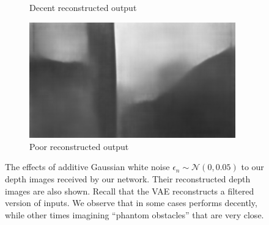 \begin{figure}[H]
\begin{subfigure}[b]{0.49\textwidth}
        \caption{Decent reconstructed output}
        \label{fig:11_0_c_vae_image}
    \end{subfigure} 
    \hfill
    \begin{subfigure}[b]{0.49\textwidth}
        \centering
        \captionsetup{justification=centering}
        \includegraphics[width=0.98\textwidth]{figures/7_2/60_0_c_vae_image.png}
        \caption{Poor reconstructed output}
        \label{fig:60_0_c_vae_image}
    \end{subfigure}
    \caption{The effects of additive Gaussian white noise $\epsilon_n \sim \mathcal{N}(0, 0.05)$ to our depth images received by our network. Their reconstructed depth images are also shown. Recall that the VAE reconstructs a filtered version of inputs. We observe that in some cases performs decently, while other times imagining ``phantom obstacles'' that are very close.}
    \label{fig:7_noisy_depth_png}
\end{figure}

